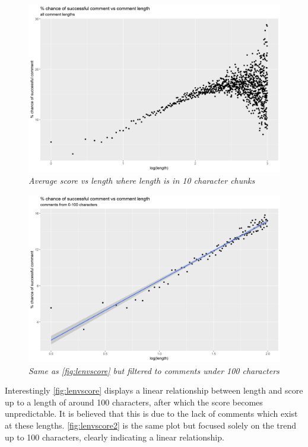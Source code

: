     \begin{figure}[H]
        \centering
        \includegraphics[width=1.0\textwidth]{graphs/lengthvsscore.png}
        \caption{\textit{Average score vs length where length is in 10 character chunks}}
        \label{fig:lenvscore}
    \end{figure}
    
    \begin{figure}[H]
        \centering
        \includegraphics[width=1.0\textwidth]{graphs/lengthvsscore2.png}
        \caption{\textit{Same as \autoref{fig:lenvscore} but filtered to comments under 100 characters}}
        \label{fig:lenvscore2}
    \end{figure}

    Interestingly \autoref{fig:lenvscore} displays a linear relationship between length and score up to a length of around 100 characters, after which the score becomes unpredictable. It is believed that this is due to the lack of comments which exist at these lengths. \autoref{fig:lenvscore2} is the same plot but focused solely on the trend up to 100 characters, clearly indicating a linear relationship.
    
